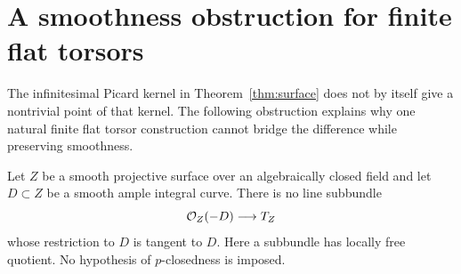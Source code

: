 \section{A smoothness obstruction for finite flat torsors}

The infinitesimal Picard kernel in Theorem~\ref{thm:surface} does not by itself give a nontrivial point of that kernel. The following obstruction explains why one natural finite flat torsor construction cannot bridge the difference while preserving smoothness.

\begin{proposition}\label{prop:tangent-ample}
Let $Z$ be a smooth projective surface over an algebraically closed field and let $D\subset Z$ be a smooth ample integral curve. There is no line subbundle
\[
 \mathcal O_Z(-D)\longrightarrow T_Z
\]
whose restriction to $D$ is tangent to $D$. Here a subbundle has locally free quotient. No hypothesis of $p$-closedness is imposed.
\end{proposition}

